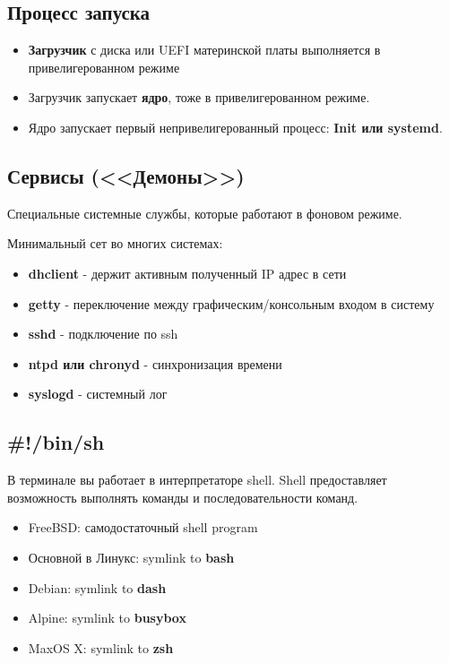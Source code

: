 \subsection{Процесс запуска}

\begin{itemize}
	\item \textbf{Загрузчик} с диска или UEFI материнской платы выполняется в привелигерованном режиме
	\item Загрузчик запускает \textbf{ядро}, тоже в привелигерованном режиме.
	\item Ядро запускает первый непривелигерованный процесс: \textbf{Init или systemd}.
\end{itemize}

\subsection{Сервисы (<<Демоны>>)}

Специальные системные службы, которые работают в фоновом режиме.

Минимальный сет во многих системах:
\begin{itemize}
	\item \textbf{dhclient} - держит активным полученный IP адрес в сети
	\item \textbf{getty} - переключение между графическим/консольным входом в систему
	\item \textbf{sshd} - подключение по ssh
	\item \textbf{ntpd или chronyd} - синхронизация времени
	\item \textbf{syslogd} - системный лог
\end{itemize}

\subsection{\#!/bin/sh}

В терминале вы работает в интерпретаторе shell. Shell предоставляет возможность выполнять
команды и последовательности команд.

\begin{itemize}
	\item FreeBSD: самодостаточный shell program
	\item Основной в Линукс: symlink to \textbf{bash}
	\item Debian: symlink to \textbf{dash}
	\item Alpine: symlink to \textbf{busybox}
	\item MaxOS X: symlink to \textbf{zsh}
\end{itemize}

